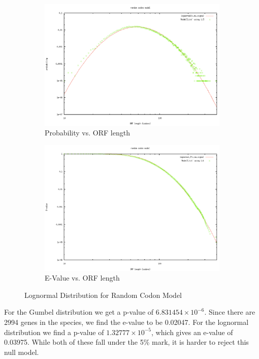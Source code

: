\documentclass[11pt]{article}
\begin{document}
\begin{figure}[!htb]
        \centering
        \begin{subfigure}[b]{0.49\textwidth}
                \centering
		\includegraphics[width=\textwidth]{Model3LogProb.pdf} 
		\caption{Probability vs. ORF length}
        \end{subfigure}
        \begin{subfigure}[b]{0.49\textwidth}
                \centering
		\includegraphics[width=\textwidth]{Model3LogE.pdf} 
		\caption{E-Value vs. ORF length}
        \end{subfigure}

        \caption{Lognormal Distribution for Random Codon Model}\label{fig:Model3Log}
\end{figure}

For the Gumbel distribution we get a p-value of $6.831454 \times 10^{-6}$.  Since there are 2994 genes in the species, we find the e-value to be 0.02047.  For the lognormal distribution we find a p-value of $1.32777 \times 10^{-5}$, which gives an e-value of 0.03975.  While both of these fall under the 5\% mark, it is harder to reject this null model.
\end{document}
